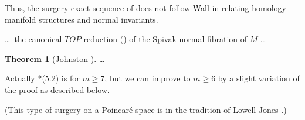 \documentclass{amsart}
\newtheorem{thm}{Theorem}[section]
\begin{document}
Thus, the surgery exact sequence of
\cite{BFMW} does not follow Wall \cite{Wa} in
relating homology manifold structures and
normal invariants.

\dots\ the canonical $TOP$ reduction
(\cite{FP}) of the Spivak normal fibration of
$M$ \dots

\begin{thm}[Johnston \cite{Jo}]
\dots
\end{thm}

Actually \cite{Jo}*{(5.2)} is for $m\geq 7$,
but we can improve to $m\geq 6$ by a slight
variation of the proof as described below.

(This type of surgery on a Poincar\'e space
is in the tradition of Lowell Jones
\cite{Jn}.)



\end{document}
